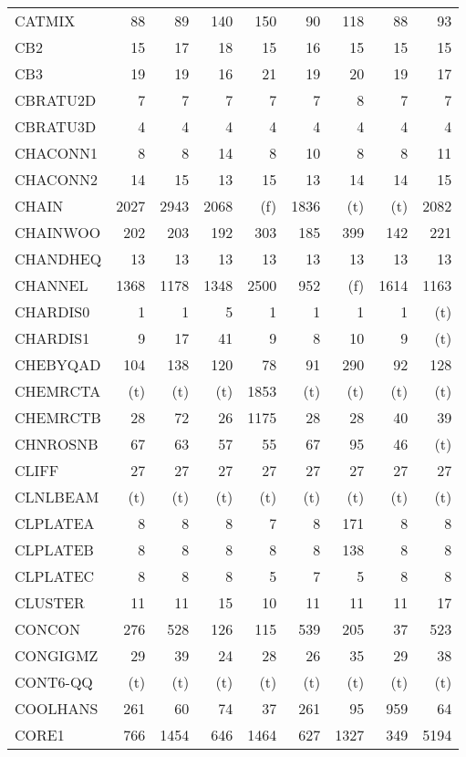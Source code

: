 \documentclass[11pt,twoside]{article}
\begin{document}
{\begin{longtable}[c]{|l|r|r|r|r|r|r|r|r|}
 CATMIX & 88 & 89 & 140 & 150 & 90 & 118 & 88 & 93 \\
 CB2 & 15 & 17 & 18 & 15 & 16 & 15 & 15 & 15 \\
 CB3 & 19 & 19 & 16 & 21 & 19 & 20 & 19 & 17 \\
 CBRATU2D & 7 & 7 & 7 & 7 & 7 & 8 & 7 & 7 \\
 CBRATU3D & 4 & 4 & 4 & 4 & 4 & 4 & 4 & 4 \\
 CHACONN1 & 8 & 8 & 14 & 8 & 10 & 8 & 8 & 11 \\
 CHACONN2 & 14 & 15 & 13 & 15 & 13 & 14 & 14 & 15 \\
 CHAIN & 2027 & 2943 & 2068 & (f) & 1836 & (t) & (t) & 2082 \\
 CHAINWOO & 202 & 203 & 192 & 303 & 185 & 399 & 142 & 221 \\
 CHANDHEQ & 13 & 13 & 13 & 13 & 13 & 13 & 13 & 13 \\
 CHANNEL & 1368 & 1178 & 1348 & 2500 & 952 & (f) & 1614 & 1163 \\
 CHARDIS0 & 1 & 1 & 5 & 1 & 1 & 1 & 1 & (t) \\
 CHARDIS1 & 9 & 17 & 41 & 9 & 8 & 10 & 9 & (t) \\
 CHEBYQAD & 104 & 138 & 120 & 78 & 91 & 290 & 92 & 128 \\
 CHEMRCTA & (t) & (t) & (t) & 1853 & (t) & (t) & (t) & (t) \\
 CHEMRCTB & 28 & 72 & 26 & 1175 & 28 & 28 & 40 & 39 \\
 CHNROSNB & 67 & 63 & 57 & 55 & 67 & 95 & 46 & (t) \\
 CLIFF & 27 & 27 & 27 & 27 & 27 & 27 & 27 & 27 \\
 CLNLBEAM & (t) & (t) & (t) & (t) & (t) & (t) & (t) & (t) \\
 CLPLATEA & 8 & 8 & 8 & 7 & 8 & 171 & 8 & 8 \\
 CLPLATEB & 8 & 8 & 8 & 8 & 8 & 138 & 8 & 8 \\
 CLPLATEC & 8 & 8 & 8 & 5 & 7 & 5 & 8 & 8 \\
 CLUSTER & 11 & 11 & 15 & 10 & 11 & 11 & 11 & 17 \\
 CONCON & 276 & 528 & 126 & 115 & 539 & 205 & 37 & 523 \\
 CONGIGMZ & 29 & 39 & 24 & 28 & 26 & 35 & 29 & 38 \\
 CONT6-QQ & (t) & (t) & (t) & (t) & (t) & (t) & (t) & (t) \\
 COOLHANS & 261 & 60 & 74 & 37 & 261 & 95 & 959 & 64 \\
 CORE1 & 766 & 1454 & 646 & 1464 & 627 & 1327 & 349 & 5194 \\

\end{longtable}}
\end{document}
